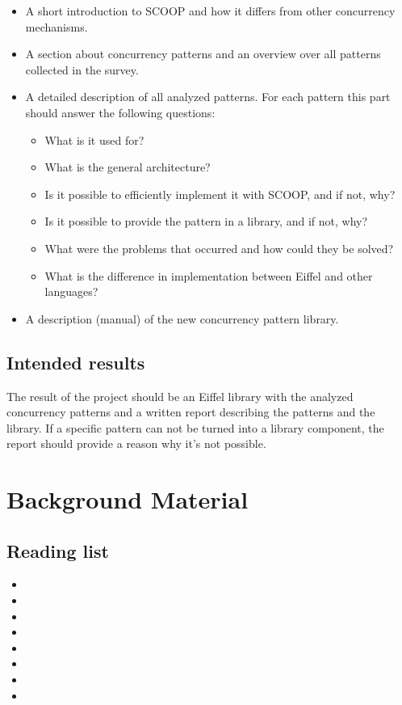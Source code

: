 \documentclass[a4paper,10pt]{article}
\begin{document}
\begin{itemize}
\item A short introduction to SCOOP and how it differs from other concurrency mechanisms.
\item A section about concurrency patterns and an overview over all patterns collected in the survey.
\item A detailed description of all analyzed patterns. For each pattern this part should answer the following questions:
\begin {itemize}
\item What is it used for?
\item What is the general architecture?
\item Is it possible to efficiently implement it with SCOOP, and if not, why?
\item Is it possible to provide the pattern in a library, and if not, why?
\item What were the problems that occurred and how could they be solved?
\item What is the difference in implementation between Eiffel and other languages?
\end {itemize}
\item A description (manual) of the new concurrency pattern library.
\end {itemize}

\subsection {Intended results}
The result of the project should be an Eiffel library with the analyzed concurrency patterns and a written report describing the patterns and the library. If a specific pattern can not be turned into a library component, the report should provide a reason why it’s not possible.
\section {Background Material}
\label {sec:background-material}
\subsection {Reading list}
\begin{flushleft}
\begin{itemize}
\item {}
\item {}
\item {}
\item {}
\item {}
\item {}
\item {}
\item {}
\end{itemize}
\end{flushleft}
\end{document}

